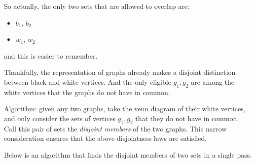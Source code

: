 \documentclass{article}
\begin{document}
So actually, the only two sets that are allowed to overlap are:
\begin{itemize}
\item $b_1$, $b_2$
\item $w_1$, $w_2$
\end{itemize}
and this is easier to remember.

Thankfully, the representation of graphs already makes a disjoint distinction between black and white vertices. And the only eligible $g_1, g_2$ are among the white vertices that the graphs do not have in common.

Algorithm: given any two graphs, take the venn diagram of their white vertices, and only consider the sets of vertices $g_1, g_2$ that they do not have in common. Call this pair of sets the \emph{disjoint members} of the two graphs. This narrow consideration ensures that the above disjointness laws are satisfied.

Below is an algorithm that finds the disjoint members of two sets in a single pass.
\end{document}
